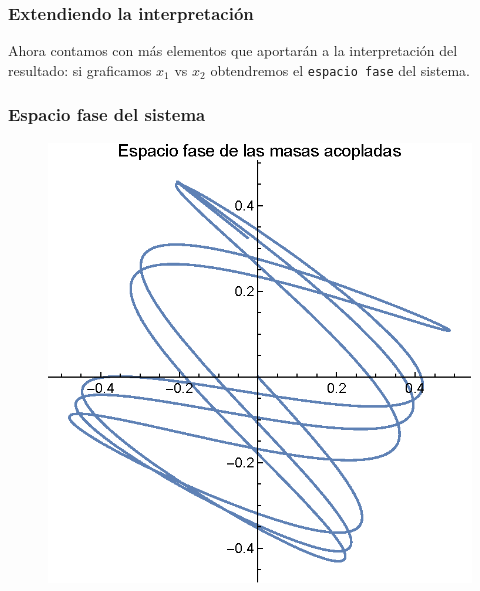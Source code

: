 \begin{frame}   
\frametitle{Extendiendo la interpretación}
Ahora contamos con más elementos que aportarán a la interpretación del resultado: si graficamos $x_{1}$ vs $x_{2}$ obtendremos el \texttt{espacio fase} del sistema.
\end{frame}
\begin{frame}
\frametitle{Espacio fase del sistema}
\begin{figure}[H]
    \centering
    \includegraphics[scale=0.7]{Imagenes/Ejercicio_masas_acopladas_03.eps}
\end{figure}
\end{frame}
